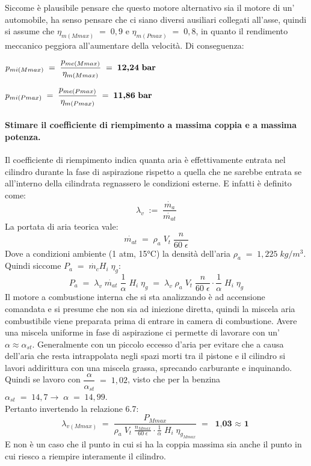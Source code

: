 \documentclass[a4paper, twoside, 12pt]{report}
\begin{document}
Siccome è plausibile pensare che questo motore alternativo sia il motore di un' automobile, ha senso pensare che ci siano diversi ausiliari collegati all'asse, quindi si assume che $\eta_{m(Mmax)}\;=\;0,9$ e $\eta_{m(Pmax)}\;=\;0,8$, in quanto il rendimento meccanico peggiora all'aumentare della velocità. Di conseguenza:
\begin{center}
	$p_{mi(Mmax)}\;=\;\dfrac{p_{me(Mmax)}}{\eta_{m(Mmax)}}\;=\;\textbf{12,24\;bar}$
\end{center}
\begin{center}
	$p_{mi(Pmax)}\;=\;\dfrac{p_{me(Pmax)}}{\eta_{m(Pmax)}}\;=\;\textbf{11,86\;bar}$
\end{center}
\paragraph{Stimare il coefficiente di riempimento a massima coppia e a massima potenza.\\}
Il coefficiente di riempimento indica quanta aria è effettivamente entrata nel cilindro durante la fase di aspirazione rispetto a quella che ne sarebbe entrata se all'interno della cilindrata regnassero le condizioni esterne. E infatti è definito come:
\begin{equation}
	\lambda_{v}\;:=\;\dfrac{\dot{m_{a}}}{\dot{m_{at}}}
\end{equation}
La portata di aria teorica vale:
\begin{equation}
	\dot{m_{at}}\;=\;\rho_{a}\;V_{t}\;\dfrac{n}{60\;\epsilon}
\end{equation}
Dove a condizioni ambiente (1 atm, 15°C) la densità dell'aria $\rho_{a}\;=\;1,225\;kg/m^{3}$.\\
Quindi siccome $P_{a}\;=\;\dot{m_{c}}H_{i}\;\eta_{g}$:
\begin{equation}
	P_{a}\;=\;\lambda_{v}\;\dot{m_{at}}\;\dfrac{1}{\alpha}\;H_{i}\;\eta_{g}\;=\;\lambda_{v}\;\rho_{a}\;V_{t}\;\dfrac{n}{60\;\epsilon}\cdot\dfrac{1}{\alpha}\;H_{i}\;\eta_{g}
\end{equation}
Il motore a combustione interna che si sta analizzando è ad accensione comandata e si presume che non sia ad iniezione diretta, quindi la miscela aria combustibile viene preparata prima di entrare in camera di combustione. Avere una miscela uniforme in fase di aspirazione ci permette di lavorare con un' $\alpha \approx \alpha_{st}$. Generalmente con un piccolo eccesso d'aria per evitare che a causa dell'aria che resta intrappolata negli spazi morti tra il pistone e il cilindro si lavori addirittura con una miscela grassa, sprecando carburante e inquinando.\\
Quindi se lavoro con $\dfrac{\alpha}{\alpha_{st}}\;=\;1,02$, visto che per la benzina $\alpha_{st}\;=\;14,7\to\;\alpha\;=\;14,99$.\\
Pertanto invertendo la relazione 6.7:
\begin{equation}
	\lambda_{v(Mmax)}\;=\;\dfrac{P_{Mmax}}{\rho_{a}\;V_{t}\;\frac{n_{Mmax}}{60\;\epsilon}\cdot\frac{1}{\alpha}\;H_{i}\;\eta_{g_{Mmax}}}\;=\;\textbf{1,03 $\approx$ 1}
\end{equation}
E non è un caso che il punto in cui si ha la coppia massima sia anche il punto in cui riesco a riempire interamente il cilindro.
\end{document}
